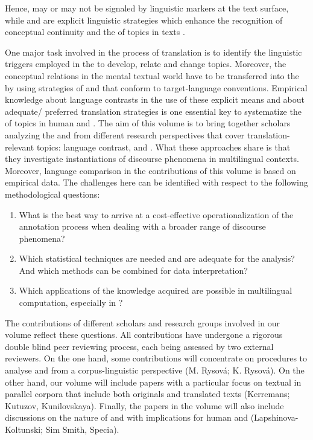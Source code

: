\documentclass[output=paper]{langsci/langscibook.cls}
\begin{document}
Hence,  may or may not be signaled by linguistic markers at the text surface, while  and  are explicit linguistic strategies which enhance the recognition of conceptual continuity and the  of topics in texts \citep{LouwerseGraesser2005,HallidayMatthiessen2004}.

One major task involved in the process of translation is to identify the linguistic triggers employed in the  to develop, relate and change topics. Moreover, the conceptual relations in the mental textual world have to be transferred into the  by using strategies of  and  that conform to target-language conventions. Empirical knowledge about language contrasts in the use of these explicit means and about adequate/ preferred translation strategies is one essential key to systematize the  of topics in human and . 
	The aim of this volume is to bring together scholars analyzing the  and  from different research perspectives that cover translation-relevant topics: language contrast,  and . What these approaches share is that they investigate instantiations of discourse phenomena in multilingual contexts. Moreover, language comparison in the contributions of this volume is based on empirical data. The challenges here can be identified with respect to the following methodological questions:
	
	\begin{enumerate}
		
		\item What is the best way to arrive at a cost-effective operationalization of the annotation process when dealing with a broader range of discourse phenomena?
		\item Which statistical techniques are needed and are adequate for the analysis? And which methods can be combined for data interpretation?
		\item Which applications of the knowledge acquired are possible in multilingual computation, especially in ?
	\end{enumerate}
	
	The contributions of different scholars and research groups involved in our volume reflect these questions. All contributions have undergone a rigorous double blind peer reviewing process, each being assessed by two external reviewers.
    On the one hand, some contributions will concentrate on procedures to analyse  and  from a corpus-linguistic perspective (M. Rysov\'{a}; K. Rysov\'{a}). On the other hand, our volume will include papers with a particular focus on textual  in parallel corpora that include both originals and translated texts (Kerremans; Kutuzov, Kunilovskaya). Finally, the papers in the volume will also include discussions on the nature of  and  with implications for human and  (Lapshinova-Koltunski; Sim Smith, Specia). 
	
\end{document}
